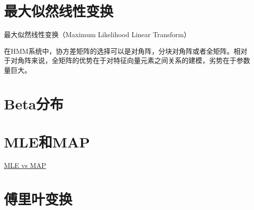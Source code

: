 \section{最大似然线性变换}
最大似然线性变换（Maximum Likelihood Linear Transform）

在HMM系统中，协方差矩阵的选择可以是对角阵，分块对角阵或者全矩阵。相对于对角阵来说，全矩阵的优势在于对特征向量元素之间关系的建模，劣势在于参数量巨大。


\section{Beta分布}
  
\section{MLE和MAP}

\href{https://wiseodd.github.io/techblog/2017/01/01/mle-vs-map/}{MLE vs MAP}

\section{傅里叶变换}
